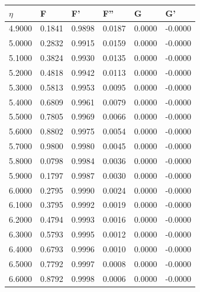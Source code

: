 \documentclass{article}
\begin{document}
\begin{table}[H]
    \centering
    \begin{tabular}{|l|l|l|l|l|l|}
        \hline
    $\eta$    &     F     &       F'     &       F''    &       G      &       G'  \\\hline 
    4.9000    &  0.1841   &     0.9898   &     0.0187   &     0.0000   &    -0.0000\\\hline
    5.0000    &  0.2832   &     0.9915   &     0.0159   &     0.0000   &    -0.0000\\\hline
    5.1000    &  0.3824   &     0.9930   &     0.0135   &     0.0000   &    -0.0000\\\hline
    5.2000    &  0.4818   &     0.9942   &     0.0113   &     0.0000   &    -0.0000\\\hline
    5.3000    &  0.5813   &     0.9953   &     0.0095   &     0.0000   &    -0.0000\\\hline
    5.4000    &  0.6809   &     0.9961   &     0.0079   &     0.0000   &    -0.0000\\\hline
    5.5000    &  0.7805   &     0.9969   &     0.0066   &     0.0000   &    -0.0000\\\hline
    5.6000    &  0.8802   &     0.9975   &     0.0054   &     0.0000   &    -0.0000\\\hline
    5.7000    &  0.9800   &     0.9980   &     0.0045   &     0.0000   &    -0.0000\\\hline
    5.8000    &  0.0798   &     0.9984   &     0.0036   &     0.0000   &    -0.0000\\\hline
    5.9000    &  0.1797   &     0.9987   &     0.0030   &     0.0000   &    -0.0000\\\hline
    6.0000    &  0.2795   &     0.9990   &     0.0024   &     0.0000   &    -0.0000\\\hline
    6.1000    &  0.3795   &     0.9992   &     0.0019   &     0.0000   &    -0.0000\\\hline
    6.2000    &  0.4794   &     0.9993   &     0.0016   &     0.0000   &    -0.0000\\\hline
    6.3000    &  0.5793   &     0.9995   &     0.0012   &     0.0000   &    -0.0000\\\hline
    6.4000    &  0.6793   &     0.9996   &     0.0010   &     0.0000   &    -0.0000\\\hline
    6.5000    &  0.7792   &     0.9997   &     0.0008   &     0.0000   &    -0.0000\\\hline
    6.6000    &  0.8792   &     0.9998   &     0.0006   &     0.0000   &    -0.0000\\\hline

\end{tabular}
\end{table}
\end{document}
